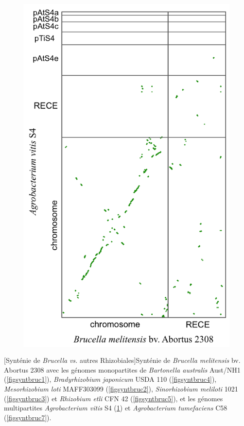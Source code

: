 \begin{figure}[H]
\begin{center}
\begin{minipage}{0.5\textwidth}
		\includegraphics[width=\textwidth]{./img/synteny/new/fig8_8f.png}
		\label{figsyntbruc6}
	\end{minipage}
\end{center}
\hspace{-3cm}
\end{figure}  

[Synténie de \textit{Brucella} \textit{vs.} autres Rhizobiales]{Synténie de \textit{Brucella melitensis} bv. Abortus 2308 avec les génomes monopartites de \textit{Bartonella australis} Aust/NH1 (\ref{figsyntbruc1}), \textit{Bradyrhizobium japonicum} USDA 110 (\ref{figsyntbruc4}), \textit{Mesorhizobium loti} MAFF303099 (\ref{figsyntbruc2}), \textit{Sinorhizobium meliloti} 1021 (\ref{figsyntbruc3}) et \textit{Rhizobium etli} CFN 42 (\ref{figsyntbruc5}), et les génomes multipartites \textit{Agrobacterium vitis} S4 (\ref{figsyntbruc6}) et \textit{Agrobacterium tumefaciens} C58 (\ref{figsyntbruc7}).} \label{figsyntbruc}

